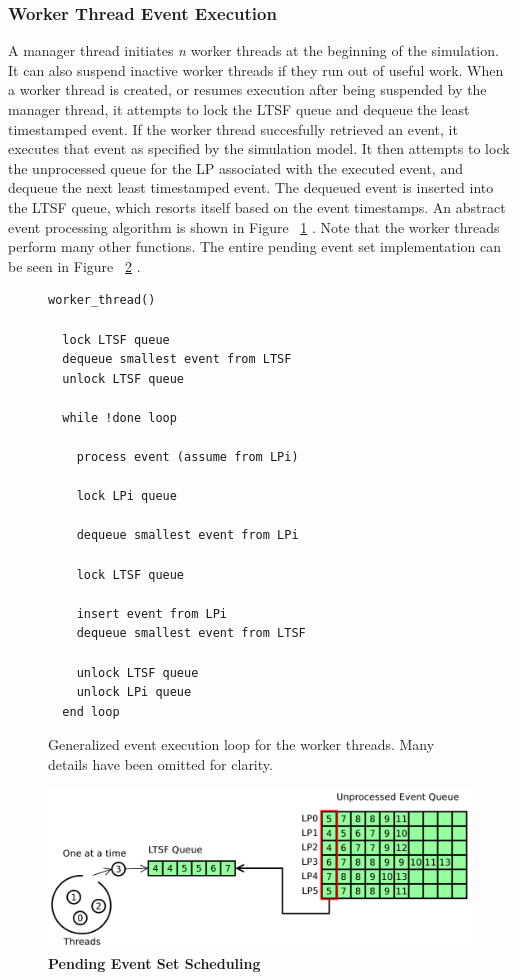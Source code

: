 \documentclass[a4paper]{article}
\begin{document}
\subsubsection{\textbf{Worker Thread Event Execution}}

A manager thread initiates \textit{n} worker threads at the beginning of the
simulation.  It can also suspend inactive worker threads if they run out of
useful work.  When a worker thread is created, or resumes execution after being
suspended by the manager thread, it attempts to lock the LTSF queue and dequeue
the least timestamped event.  If the worker thread succesfully retrieved an
event, it executes that event as specified by the simulation model.  It then
attempts to lock the unprocessed queue for the LP associated with the executed
event, and dequeue the next least timestamped event.  The dequeued event is
inserted into the LTSF queue, which resorts itself based on the event
timestamps.  An abstract event processing algorithm is shown in Figure
~\ref{workerThreadAlgorithm} \cite{dickman}.  Note that the worker threads
perform many other functions.  The entire pending event set implementation can
be seen in Figure ~\ref{fig:singleLTSFqueue} \cite{dickman}.

\linespread{1.0}
\begin{figure}
\begin{verbatim}
worker_thread()

  lock LTSF queue
  dequeue smallest event from LTSF
  unlock LTSF queue

  while !done loop

    process event (assume from LPi)

    lock LPi queue 

    dequeue smallest event from LPi

    lock LTSF queue

    insert event from LPi
    dequeue smallest event from LTSF

    unlock LTSF queue
    unlock LPi queue
  end loop
\end{verbatim}
\linespread{2.0}
\caption{Generalized event execution loop for the worker threads.  Many details
  have been omitted for clarity.}\label{workerThreadAlgorithm}
\end{figure}

\begin{figure}[H]
    \centering
    \graphicspath{ {./figures/} }
    \includegraphics[width=\textwidth,height=\textheight,keepaspectratio]{single_ltsf_queue}
    \caption{\textbf{Pending Event Set Scheduling}}
    \label{fig:singleLTSFqueue}
\end{figure}
\end{document}
